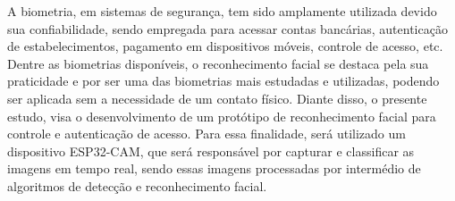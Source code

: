 
\begin{resumoutfpr}%

A biometria, em sistemas de segurança, tem sido amplamente utilizada devido sua 
confiabilidade, sendo empregada para acessar contas bancárias, autenticação de 
estabelecimentos, pagamento em dispositivos móveis, controle de acesso, etc. 
Dentre as biometrias disponíveis, o reconhecimento facial se destaca pela sua 
praticidade e por ser uma das biometrias mais estudadas e utilizadas, 
podendo ser aplicada sem a necessidade de um contato físico. Diante disso, 
o presente estudo, visa o desenvolvimento de um protótipo de 
reconhecimento facial para controle e autenticação de acesso. Para essa finalidade, 
será utilizado um dispositivo ESP32-CAM, que será responsável por capturar e 
classificar as imagens em tempo real, sendo essas imagens processadas por intermédio 
de algoritmos de detecção e reconhecimento facial.
\end{resumoutfpr}
